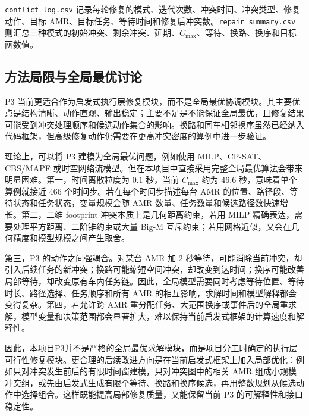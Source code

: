 \verb|conflict_log.csv| 记录每轮修复的模式、迭代次数、冲突时间、冲突类型、修复动作、目标 AMR、目标任务、等待时间和修复后冲突数。\verb|repair_summary.csv| 则汇总三种模式的初始冲突、剩余冲突、延期、$C_{\max}$、等待、换路、换序和目标函数值。

\subsection{方法局限与全局最优讨论}

P3 当前更适合作为启发式执行层修复模块，而不是全局最优协调模块。其主要优点是结构清晰、动作直观、输出稳定；主要不足是不能保证全局最优，且修复结果可能受到冲突处理顺序和候选动作集合的影响。换路和同车相邻换序虽然已经纳入代码框架，但高级修复动作仍需要在更高冲突密度的算例中进一步验证。

理论上，可以将 P3 建模为全局最优问题，例如使用 MILP、CP-SAT、CBS/MAPF 或时空网络流模型。但在本项目中直接采用完整全局最优算法会带来明显困难。第一，时间离散粒度为 $0.1$ 秒，当前 $C_{\max}$ 约为 46.6 秒，意味着单个算例就接近 466 个时间步。若在每个时间步描述每台 AMR 的位置、路径段、等待状态和任务状态，变量规模会随 AMR 数量、任务数量和候选路径数快速增长。第二，二维 footprint 冲突本质上是几何距离约束，若用 MILP 精确表达，需要处理平方距离、二阶锥约束或大量 Big-M 互斥约束；若用网格近似，又会在几何精度和模型规模之间产生取舍。

第三，P3 的动作之间强耦合。对某台 AMR 加 2 秒等待，可能消除当前冲突，却引入后续任务的新冲突；换路可能缩短空间冲突，却改变到达时间；换序可能改善局部等待，却改变原有车内任务链。因此，全局模型需要同时考虑等待位置、等待时长、路径选择、任务顺序和所有 AMR 的相互影响，求解时间和模型解释都会变得复杂。第四，若允许跨 AMR 重分配任务、大范围换序或事件后的全局重求解，模型变量和决策范围都会显著扩大，难以保持当前启发式框架的计算速度和解释性。

因此，本项目P3并不是严格的全局最优求解模块，而是项目分工时确定的执行层可行性修复模块。更合理的后续改进方向是在当前启发式框架上加入局部优化：例如只对冲突发生前后的有限时间窗建模，只对冲突图中的相关 AMR 组成小规模冲突组，或先由启发式生成有限个等待、换路和换序候选，再用整数规划从候选动作中选择组合。这样既能提高局部修复质量，又能保留当前 P3 的可解释性和接口稳定性。
